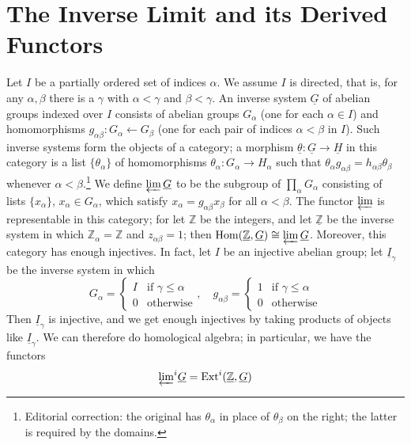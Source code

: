 \documentclass[../main]{subfiles}
\begin{document}
\chapter{The Inverse Limit and its Derived Functors}
\label{sec:p3c08}

Let $I$ be a partially ordered set of indices $\alpha$. We assume $I$ is directed, that is, for any $\alpha,\beta$ there is a $\gamma$ with $\alpha < \gamma$ and $\beta<\gamma$. An inverse system $\underline{G}$ of abelian groups indexed over $I$ consists of abelian groups $G_\alpha$ (one for each $\alpha \in I$) and homomorphisms $g_{\alpha\beta}:G_\alpha \longleftarrow G_\beta$ (one for each pair of indices $\alpha<\beta$ in $I$). Such inverse systems form the objects of a category; a morphism $\underline{\theta}:\underline{G}\longrightarrow\underline{H}$ in this category is a list $\{\theta_\alpha\}$ of homomorphisms $\theta_\alpha:G_\alpha \to H_\alpha$ such that $\theta_\alpha g_{\alpha\beta} = h_{\alpha\beta}\theta_\beta$ whenever $\alpha < \beta$.\footnote{Editorial correction: the original has $\theta_\alpha$ in place of $\theta_\beta$ on the right; the latter is required by the domains.} We define $\varprojlim\underline{G}$ to be the subgroup of $\prod_\alpha G_\alpha$ consisting of lists $\{x_\alpha\}$, $x_\alpha\in G_\alpha$, which satisfy $x_\alpha = g_{\alpha\beta}x_\beta$ for all $\alpha<\beta$. The functor $\varprojlim$ is representable in this category; for let $\mathbb{Z}$ be the integers, and let $\underline{\mathbb{Z}}$ be the inverse system in which $\mathbb{Z}_\alpha = \mathbb{Z}$ and $z_{\alpha\beta}=1$; then $\operatorname{Hom}(\underline{\mathbb{Z}},\underline{G})\cong \varprojlim\underline{G}$. Moreover, this category has enough injectives. In fact, let $I$ be an injective abelian group; let $\underline{I}_\gamma$ be the inverse system in which
\[G_\alpha=\begin{cases}
  I  & \text{if } \gamma\leq\alpha \\
  0 & \text{otherwise}
\end{cases}, \quad 
g_{\alpha\beta}=\begin{cases} 1 & \text{if } \gamma\leq\alpha \\ 0 & \text{otherwise} \end{cases}\] 
Then $\underline{I}_\gamma$ is injective, and we get enough injectives by taking products of objects like $\underline{I}_\gamma$. We can therefore do homological algebra; in particular, we have the functors 
\[{\varprojlim}^i\underline{G}=\operatorname{Ext}^i(\underline{\mathbb{Z}},\underline{G})\]
\end{document}

